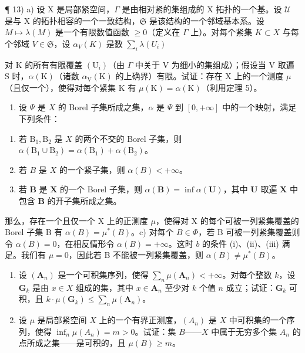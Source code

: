 ¶ 13) a) 设 X 是局部紧空间，\(\Gamma\) 是由相对紧的集组成的 X 拓扑的一个基。设 \(\mathcal{U}\) 是与 X 的拓扑相容的一个一致结构，\(\mathfrak{S}\) 是该结构的一个邻域基本系。设 \(M \mapsto \lambda(M)\) 是一个有限数值函数 \(\geqslant 0\)（定义在 \(\Gamma\) 上）。对每个紧集 \(K \subset X\) 与每个邻域 \(V \in \mathfrak{S}\)，设 \(\alpha_V(K)\) 是数 \(\sum_{i} \lambda(U_i)\)

对 K 的所有有限覆盖 \((\mathrm{U}_{i})\)（由 \(\Gamma\) 中关于 V 为细小的集组成）；假设当 V 取遍 S 时，\(\alpha(\mathrm{K})\)（诸数 \(\alpha_{\mathrm{V}}(\mathrm{K})\) 的上确界）有限。试证：存在 X 上的一个测度 \(\mu\)（且仅一个），使得对每个紧集 K 有 \(\mu(\mathrm{K}) = \alpha(\mathrm{K})\)（利用定理 5）。

\begin{enumerate}
\def\labelenumi{\alph{enumi})}
\setcounter{enumi}{1}
\tightlist
\item
  设 \(\Psi\) 是 \(X\) 的 Borel 子集所成之集，\(\alpha\) 是 \(\Psi\) 到 \([0, +\infty]\) 中的一个映射，满足下列条件：
\end{enumerate}

\begin{enumerate}
\def\labelenumi{(\roman{enumi})}
\item
  若 \(\mathrm{B}_1, \mathrm{B}_2\) 是 \(X\) 的两个不交的 Borel 子集，则 \(\alpha(\mathrm{B}_1 \cup \mathrm{B}_2) = \alpha(\mathrm{B}_1) + \alpha(\mathrm{B}_2)\)。\\
\item
  若 \(B\) 是 \(X\) 的一个紧子集，则 \(\alpha(B) < +\infty\)。
\item
  若 \(\mathbf{B}\) 是 \(\mathbf{X}\) 的一个 Borel 子集，则 \(\alpha(\mathbf{B}) = \inf \alpha(\mathbf{U})\)，其中 \(\mathbf{U}\) 取遍 \(\mathbf{X}\) 中包含 \(\mathbf{B}\) 的开子集所成之集。
\end{enumerate}

那么，存在一个且仅一个 X 上的正测度 \(\mu\)，使得对 X 的每个可被一列紧集覆盖的 Borel 子集 B 有 \(\alpha(B) = \mu^{*}(B)\)。c) 对每个 \(B \in \Phi\)，若 B 可被一列紧集覆盖则令 \(\alpha(B) = 0\)，在相反情形令 \(\alpha(B) = +\infty\)。这时 \(b\) 的条件 (i)、(ii)、(iii) 满足。我们有 \(\mu = 0\)，因此若 B 不能被一列紧集覆盖，则 \(\alpha(B) \neq \mu^{*}(B)\)。

\begin{enumerate}
\def\labelenumi{\arabic{enumi})}
\setcounter{enumi}{13}
\item
  设 \((\mathbf{A}_n)\) 是一个可积集序列，使得 \(\sum_{n} \mu(\mathbf{A}_n) < +\infty\)。对每个整数 \(k\)，设 \(\mathbf{G}_k\) 是由 \(x \in X\) 组成的集，其中 \(x \in \mathbf{A}_n\) 至少对 \(k\) 个值 \(n\) 成立；试证：\(\mathbf{G}_k\) 可积，且 \(k \cdot \mu(\mathbf{G}_k) \leqslant \sum_{n} \mu(\mathbf{A}_n)\)。
\item
  设 \(\mu\) 是局部紧空间 \(X\) 上的一个有界正测度，\((A_n)\) 是 \(X\) 中可积集的一个序列，使得 \(\inf_{n} \mu(A_n) = m > 0\)。试证：集 \(B\)——\(X\) 中属于无穷多个集 \(A_n\) 的点所成之集——是可积的，且 \(\mu(B) \geqslant m\)。
\end{enumerate}

